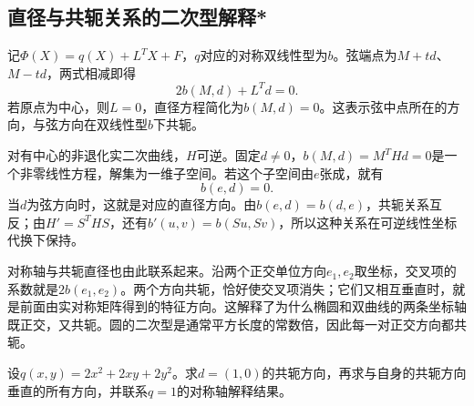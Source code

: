 \newpage
\subsection{直径与共轭关系的二次型解释*}
\label{subsec:quadratic-conjugacy-and-quadratic-forms}

记\(\Phi(X)=q(X)+L^TX+F\)，\(q\)对应的对称双线性型为\(b\)。弦端点为\(M+td\)、\(M-td\)，两式相减即得
\begin{equation}\label{eq:quadratic-diameter-bilinear}
    2b(M,d)+L^Td=0 .
\end{equation}
若原点为中心，则\(L=0\)，直径方程简化为\(b(M,d)=0\)。这表示弦中点所在的方向，与弦方向在双线性型\(b\)下共轭。

对有中心的非退化实二次曲线，\(H\)可逆。固定\(d\ne0\)，\(b(M,d)=M^THd=0\)是一个非零线性方程，解集为一维子空间。若这个子空间由\(e\)张成，就有
\begin{equation*}
    b(e,d)=0 .
\end{equation*}
当\(d\)为弦方向时，这就是对应的直径方向。由\(b(e,d)=b(d,e)\)，共轭关系互反；由\(H'=S^THS\)，还有\(b'(u,v)=b(Su,Sv)\)，所以这种关系在可逆线性坐标代换下保持。

对称轴与共轭直径也由此联系起来。沿两个正交单位方向\(e_1,e_2\)取坐标，交叉项的系数就是\(2b(e_1,e_2)\)。两个方向共轭，恰好使交叉项消失；它们又相互垂直时，就是前面由实对称矩阵得到的特征方向。这解释了为什么椭圆和双曲线的两条坐标轴既正交，又共轭。圆的二次型是通常平方长度的常数倍，因此每一对正交方向都共轭。

\begin{example}
设\(q(x,y)=2x^2+2xy+2y^2\)。求\(d=(1,0)\)的共轭方向，再求与自身的共轭方向垂直的所有方向，并联系\(q=1\)的对称轴解释结果。
\end{example}

